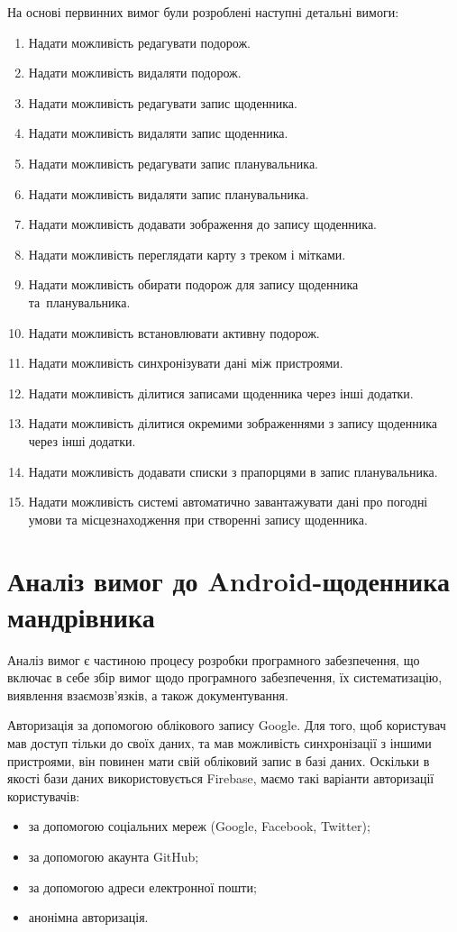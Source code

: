 \documentclass[../main.tex]{subfiles}
\begin{document}
На основі первинних вимог були розроблені наступні детальні вимоги:
\begin{enumerate}
	\item Надати можливість редагувати подорож.
	\item Надати можливість видаляти подорож.
	\item Надати можливість редагувати запис щоденника.
	\item Надати можливість видаляти запис щоденника.
	\item Надати можливість редагувати запис планувальника.
	\item Надати можливість видаляти запис планувальника.
	\item Надати можливість додавати зображення до запису щоденника.
	\item Надати можливість переглядати карту з треком і мітками.
	\item Надати можливість обирати подорож для запису щоденника та~планувальника.
	\item Надати можливість встановлювати активну подорож.
	\item Надати можливість синхронізувати дані між пристроями.
	\item Надати можливість ділитися записами щоденника через інші додатки.
	\item Надати можливість ділитися окремими зображеннями з запису щоденника через інші додатки.
	\item Надати можливість додавати списки з прапорцями в запис планувальника.
	\item Надати можливість системі автоматично завантажувати дані про погодні умови та місцезнаходження при створенні запису щоденника.
\end{enumerate}

\section{Аналіз вимог до Android-щоденника мандрівника}
Аналіз вимог є частиною процесу розробки програмного забезпечення, що включає в себе збір вимог щодо програмного забезпечення, їх систематизацію, виявлення взаємозв'язків, а також документування.

Авторизація за допомогою облікового запису Google.
Для того, щоб користувач мав доступ тільки до своїх даних, та мав можливість синхронізації з іншими пристроями, він повинен мати свій обліковий запис в базі даних. Оскільки в якості бази даних використовується Firebase, маємо такі варіанти авторизації користувачів: 
\begin{itemize}[label={--}]
	\item за допомогою соціальних мереж (Google, Facebook, Twitter);
	\item за допомогою акаунта GitHub;
	\item за допомогою адреси електронної пошти;
	\item анонімна авторизація.
\end{itemize}
\end{document}
